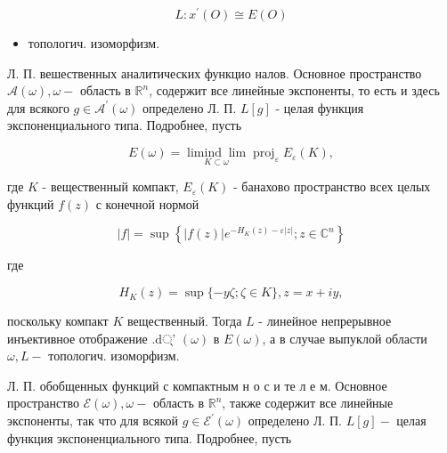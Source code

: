 \documentclass[10pt]{article}
\begin{document}
\[

L: x^{\prime}(O) \cong E(O)

\]



\begin{itemize}

  \item топологич. изоморфизм.

\end{itemize}



Л. П. вешественных аналитических функцио налов. Основное пространство $\mathscr{A}(\omega), \omega-$ область в $\mathbb{R}^{n}$, содержит все линейные экспоненты, то есть и здесь для всякого $g \in \mathscr{A}^{\prime}(\omega)$ определено Л. П. $L[g]$ - целая функция экспоненциального типа. Подробнее, пусть



\[

E(\omega)=\underset{K \subset \omega}{\operatorname{limind} \lim } \operatorname{proj}_{\varepsilon} E_{\varepsilon}(K),

\]



где $K$ - вещественный компакт, $E_{\varepsilon}(K)$ - банахово пространство всех целых функций $f(z)$ с конечной нормой



\[

|f|=\sup \left\{|f(z)| e^{-H_{K}(z)-\varepsilon|z|} ; z \in \mathbb{C}^{n}\right\}

\]



где



\[

H_{K}(z)=\sup \{-y \zeta ; \zeta \in K\}, z=x+i y,

\]



поскольку компакт $K$ вещественный. Тогда $L$ - линейное непрерывное инъективное отображение .d्' $(\omega)$ в $E(\omega)$, а в случае выпуклой области $\omega, L-$ топологич. изоморфизм.



Л. П. обобщенных функций с компактным н о с и те л е м. Основное пространство $\mathscr{E}(\omega), \omega-$ область в $\mathbb{R}^{n}$, также содержит все линейные экспоненты, так что для всякой $g \in \mathscr{E}^{\prime}(\omega)$ определено Л. П. $L[g]-$ целая функция экспоненциального типа. Подробнее, пусть
\end{document}
